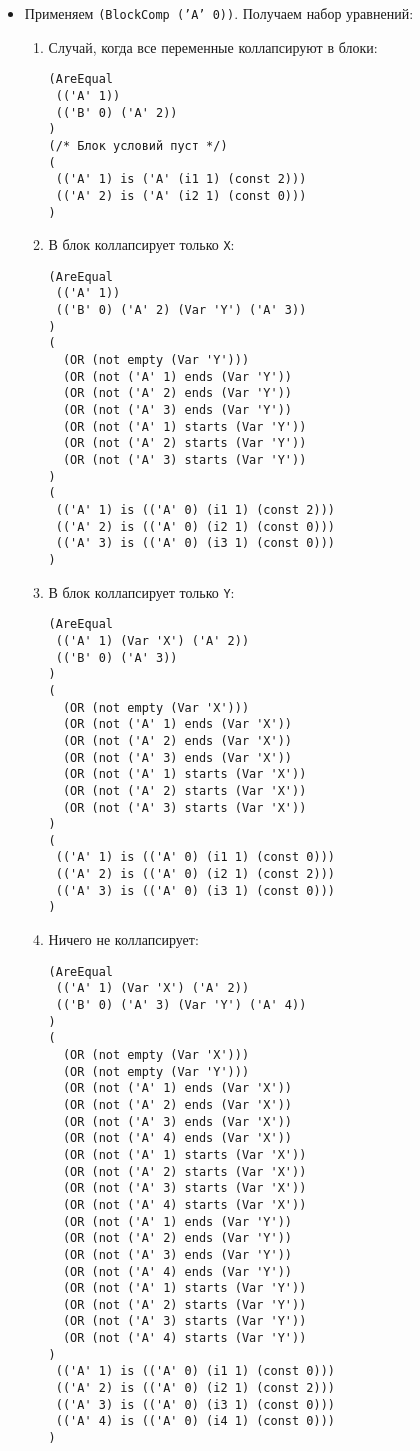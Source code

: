 \documentclass[12pt]{article}
\begin{document}
\begin{itemize}

\item Применяем \texttt{(BlockComp ('A' 0))}. Получаем набор уравнений:
\begin{enumerate}
\item Случай, когда все переменные коллапсируют в блоки:
\begin{verbatim}
(AreEqual 
 (('A' 1)) 
 (('B' 0) ('A' 2))
)
(/* Блок условий пуст */)
( 
 (('A' 1) is ('A' (i1 1) (const 2))) 
 (('A' 2) is ('A' (i2 1) (const 0))) 
)
\end{verbatim}
\item В блок коллапсирует только \verb|X|:
\begin{verbatim}
(AreEqual 
 (('A' 1)) 
 (('B' 0) ('A' 2) (Var 'Y') ('A' 3))
)
(
  (OR (not empty (Var 'Y')))
  (OR (not ('A' 1) ends (Var 'Y'))
  (OR (not ('A' 2) ends (Var 'Y'))
  (OR (not ('A' 3) ends (Var 'Y'))
  (OR (not ('A' 1) starts (Var 'Y'))
  (OR (not ('A' 2) starts (Var 'Y'))
  (OR (not ('A' 3) starts (Var 'Y'))
)
( 
 (('A' 1) is (('A' 0) (i1 1) (const 2))) 
 (('A' 2) is (('A' 0) (i2 1) (const 0))) 
 (('A' 3) is (('A' 0) (i3 1) (const 0))) 
)
\end{verbatim}
\item В блок коллапсирует только \verb|Y|:
\begin{verbatim}
(AreEqual 
 (('A' 1) (Var 'X') ('A' 2)) 
 (('B' 0) ('A' 3))
)
(
  (OR (not empty (Var 'X')))
  (OR (not ('A' 1) ends (Var 'X'))
  (OR (not ('A' 2) ends (Var 'X'))
  (OR (not ('A' 3) ends (Var 'X'))
  (OR (not ('A' 1) starts (Var 'X'))
  (OR (not ('A' 2) starts (Var 'X'))
  (OR (not ('A' 3) starts (Var 'X'))
)
( 
 (('A' 1) is (('A' 0) (i1 1) (const 0))) 
 (('A' 2) is (('A' 0) (i2 1) (const 2))) 
 (('A' 3) is (('A' 0) (i3 1) (const 0))) 
)
\end{verbatim}
\item Ничего не коллапсирует:
\begin{verbatim}
(AreEqual 
 (('A' 1) (Var 'X') ('A' 2)) 
 (('B' 0) ('A' 3) (Var 'Y') ('A' 4))
)
(
  (OR (not empty (Var 'X')))
  (OR (not empty (Var 'Y')))
  (OR (not ('A' 1) ends (Var 'X'))
  (OR (not ('A' 2) ends (Var 'X'))
  (OR (not ('A' 3) ends (Var 'X'))
  (OR (not ('A' 4) ends (Var 'X'))
  (OR (not ('A' 1) starts (Var 'X'))
  (OR (not ('A' 2) starts (Var 'X'))
  (OR (not ('A' 3) starts (Var 'X'))
  (OR (not ('A' 4) starts (Var 'X'))
  (OR (not ('A' 1) ends (Var 'Y'))
  (OR (not ('A' 2) ends (Var 'Y'))
  (OR (not ('A' 3) ends (Var 'Y'))
  (OR (not ('A' 4) ends (Var 'Y'))
  (OR (not ('A' 1) starts (Var 'Y'))
  (OR (not ('A' 2) starts (Var 'Y'))
  (OR (not ('A' 3) starts (Var 'Y'))
  (OR (not ('A' 4) starts (Var 'Y'))
)
 (('A' 1) is (('A' 0) (i1 1) (const 0))) 
 (('A' 2) is (('A' 0) (i2 1) (const 2))) 
 (('A' 3) is (('A' 0) (i3 1) (const 0))) 
 (('A' 4) is (('A' 0) (i4 1) (const 0))) 
)
\end{verbatim}


\end{enumerate}
\end{itemize}
\end{document}
